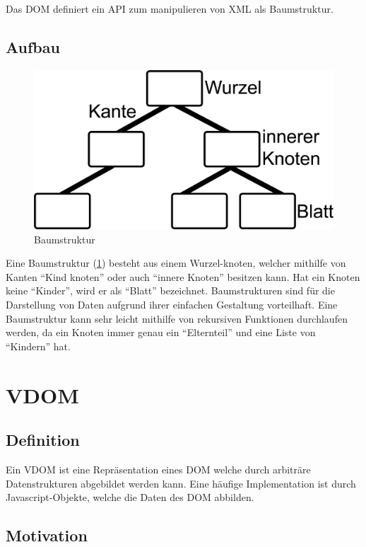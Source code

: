 Das \ac{DOM} definiert ein \ac{API} zum manipulieren von \ac{XML} als
Baumstruktur. \cite{harold}

\subsection{Aufbau}
\begin{figure}
  \includegraphics[width=\linewidth]{images/binarytree.jpg}
  \caption{Baumstruktur}
  \label{fig:binarytree}
\end{figure}

Eine Baumstruktur (\ref{fig:binarytree}) besteht aus einem Wurzel-knoten,
welcher mithilfe von Kanten ``Kind knoten'' oder auch ``innere Knoten'' besitzen
kann. Hat ein Knoten keine ``Kinder'', wird er als ``Blatt'' bezeichnet.
Baumstrukturen sind für die Darstellung von Daten aufgrund ihrer einfachen
Gestaltung vorteilhaft. Eine Baumstruktur kann sehr leicht mithilfe von
rekursiven Funktionen durchlaufen werden, da ein Knoten immer genau ein
``Elternteil'' und eine Liste von ``Kindern'' hat.

\section{\acl{VDOM}}
\subsection{Definition}

Ein \ac{VDOM} ist eine Repräsentation eines \ac{DOM} welche durch arbiträre
Datenstrukturen abgebildet werden kann. Eine häufige Implementation ist durch
Javascript-Objekte, welche die Daten des \ac{DOM} abbilden.

\subsection{Motivation}


